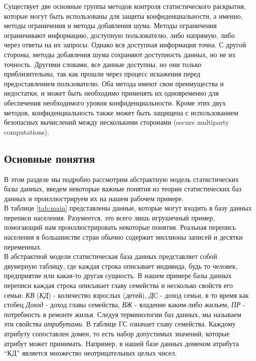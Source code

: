 Существует две основные группы методов контроля статистического раскрытия, которые могут быть использованы для защиты конфиденциальности, а именно, методы ограничения и методы добавления шума. Методы ограничения ограничивают информацию, доступную пользователю, либо напрямую, либо через ответы на их запросы. Однако вся доступная информация точна. С другой стороны, методы добавления шума сохраняют доступность данных, но не их точность. Другими словами, все данные доступны, но они только приблизительны, так как прошли через процесс искажения перед предоставлением пользователю. Оба метода имеют свои преимущества и недостатки, и может быть необходимо применять их одновременно для обеспечения необходимого уровня конфиденциальности. Кроме этих двух методов, конфиденциальность также может быть защищена с использованием безопасных вычислений между несколькими сторонами (secure multiparty computations).
\\

\subsection{Основные понятия}
В этом разделе мы подробно рассмотрим абстрактную модель статистических базы данных, введем некоторые важные понятия из теории статистических баз данных и проиллюстрируем их на нашем рабочем примере.
\\

В таблице \ref{tab:main} представлены данные, которые могут входить в базу данных переписи населения. Разумеется, это всего лишь игрушечный пример, помогающий нам проиллюстрировать некоторые понятия. Реальная перепись населения в большинстве стран обычно содержит миллионы записей и десятки переменных.
\\

В абстрактной модели статистическая база данных представляет собой двумерную таблицу, где каждая строка описывает индивида, будь то человек, предприятие или какая-то другая сущность. В нашем примере базы данных переписи каждая строка описывает главу семейства и несколько свойств его семьи: \textit{КВ} (\textit{КД}) - количество взрослых (детей), \textit{ДС} - доход семьи, в то время как стобец \textit{Доход} - доход главы семейства, \textit{ВЖ} - владение каким-либо жильем, \textit{ПР} - потребность в ремонте жилья. Следуя терминологии баз данных, мы называем эти свойства \textit{атрибутами}. В таблице ГС означает главу семейства. Каждому атрибуту сопоставлен домен, то есть набор допустимых значений, которые атрибут может принимать. Например, в нашей базе данных доменом атрибута \enquote{КД} является множество неотрицательных целых чисел.
\\

